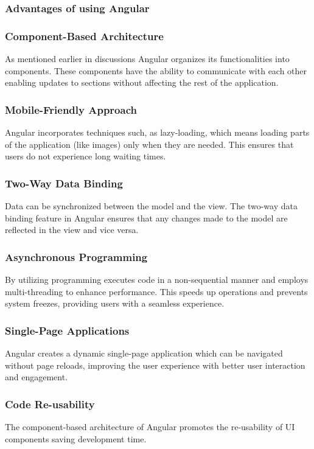 \subsubsection{Advantages of using Angular}

\subsubsection{Component-Based Architecture}
As mentioned earlier in discussions Angular organizes its functionalities into components. These components have the ability to communicate with each other enabling updates to sections without affecting the rest of the application.

\subsubsection{Mobile-Friendly Approach}
Angular incorporates techniques such, as lazy-loading, which means loading parts of the application (like images) only when they are needed. This ensures that users do not experience long waiting times.

\subsubsection{Two-Way Data Binding}
Data can be synchronized between the model and the view. The two-way data binding feature in Angular ensures that any changes made to the model are reflected 
in the view and vice versa. 

\subsubsection{Asynchronous Programming}
By utilizing programming executes code in a non-sequential manner and employs multi-threading to enhance performance. This speeds up operations and prevents system freezes, providing users with a seamless experience.

\subsubsection{Single-Page Applications}
Angular creates a dynamic single-page application which can be navigated without page reloads, improving the user experience with better user interaction and engagement.

\subsubsection {Code Re-usability}
The component-based architecture of Angular promotes the re-usability of UI components saving development time.

